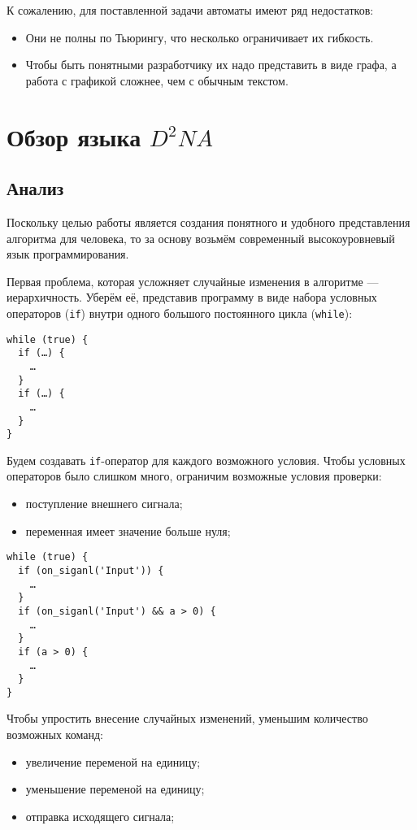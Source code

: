 \documentclass[utf8,a5paper,portrait,12pt]{eskdtext}
\begin{document}
К сожалению, для поставленной задачи автоматы имеют ряд недостатков:
\begin{itemize}
  \item Они не полны по Тьюрингу, что несколько ограничивает их гибкость.
  \item Чтобы быть понятными разработчику их надо представить в виде графа, а
        работа с графикой сложнее, чем с обычным текстом.
\end{itemize}

\newpage
\section{Обзор языка $D^2NA$}

\subsection{Анализ}

Поскольку целью работы является создания понятного и удобного представления
алгоритма для человека, то за основу возьмём современный высокоуровневый язык
программирования.

Первая проблема, которая усложняет случайные изменения в алгоритме —
иерархичность. Уберём её, представив программу в виде набора
условных операторов (\texttt{if}) внутри одного большого постоянного цикла
(\texttt{while}):

\begin{verbatim}
while (true) {
  if (…) {
    …
  }
  if (…) {
    …
  }
}
\end{verbatim}

Будем создавать \texttt{if}-оператор для каждого возможного условия. Чтобы
условных операторов было слишком много, ограничим возможные условия проверки:
\begin{itemize}
  \item поступление внешнего сигнала;
  \item переменная имеет значение больше нуля;
\end{itemize}

\begin{verbatim}
while (true) {
  if (on_siganl('Input')) {
    …
  }
  if (on_siganl('Input') && a > 0) {
    …
  }
  if (a > 0) {
    …
  }
}
\end{verbatim}

Чтобы упростить внесение случайных изменений, уменьшим количество возможных
команд:
\begin{itemize}
  \item увеличение переменой на единицу;
  \item уменьшение переменой на единицу;
  \item отправка исходящего сигнала;
\end{itemize}
\end{document}
